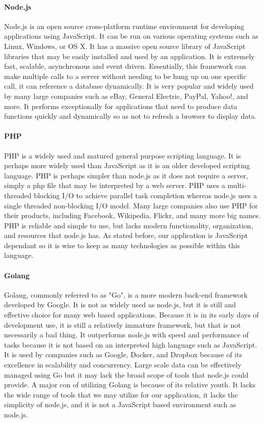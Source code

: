 	\paragraph{Node.js}
	
		Node.js is an open source cross-platform runtime environment for developing applications using JavaScript. It can be run on various operating systems such as Linux, Windows, or OS X.
		It has a massive open source library of JavaScript libraries that may be easily installed and used by an application. It is extremely fast, scalable, asynchronous and
		event driven. Essentially, this framework can make multiple calls to a server without needing to be hung up on one specific call, it can reference a database dynamically. 
		It is very popular and widely used by many large companies such as eBay, General Electric, PayPal, Yahoo!, and more. It performs exceptionally for applications that need to produce data
		functions quickly and dynamically so as not to refresh a browser to display data. 
	
	\paragraph{PHP}
	
		PHP is a widely used and matured general purpose scripting language. It is perhaps more widely used than JavaScript as it is an older developed scripting language. PHP is perhaps
		simpler than node.js as it does not require a server, simply a php file that may be interpreted by a web server. PHP uses a multi-threaded blocking I/O to achieve parallel task 
		completion whereas node.js uses a single threaded non-blocking I/O model. Many large companies also use PHP for their products, including Facebook, Wikipedia, Flickr, and many
		more big names. PHP is reliable and simple to use, but lacks modern functionality, organization, and resources that node.js has. As stated before, our application is JavaScript
		dependant so it is wise to keep as many technologies as possible within this language.
	
	\paragraph{Golang}
	
		Golang, commonly referred to as "Go", is a more modern back-end framework developed by Google. It is not as widely used as node.js, but it is still and effective choice 
		for many web based applications. Because it is in its early days of development use, it is still a relatively immature framework, but that is not necessarily a bad thing.
		It outperforms node.js with speed and performance of tasks because it is not based on an interpreted high language such as JavaScript. It is used by companies such as Google, 
		Docker, and Dropbox because of its excellence in scalability and concurrency. Large scale data can be effectively managed using Go but it may lack the broad scope of 
		tools that node.js could provide. A major con of utilizing Golang is because of its relative youth. It lacks the wide range of tools that we may
		utilize for our application, it lacks the simplicity of node.js, and it is not a JavaScript based environment such as node.js. 
	

